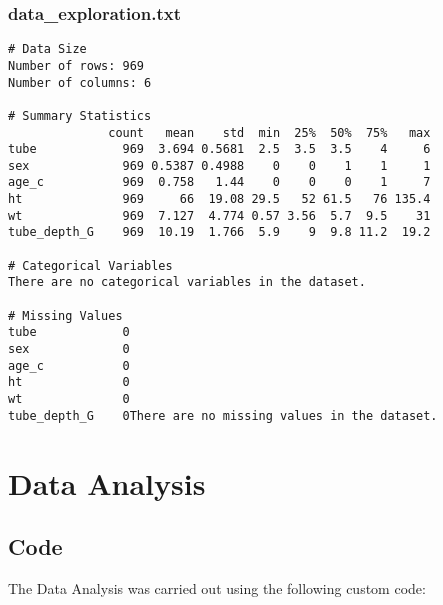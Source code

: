 \documentclass[11pt]{article}
\begin{document}
\subsubsection*{data\_exploration.txt}

\begin{Verbatim}[tabsize=4]
# Data Size
Number of rows: 969
Number of columns: 6

# Summary Statistics
              count   mean    std  min  25%  50%  75%   max
tube            969  3.694 0.5681  2.5  3.5  3.5    4     6
sex             969 0.5387 0.4988    0    0    1    1     1
age_c           969  0.758   1.44    0    0    0    1     7
ht              969     66  19.08 29.5   52 61.5   76 135.4
wt              969  7.127  4.774 0.57 3.56  5.7  9.5    31
tube_depth_G    969  10.19  1.766  5.9    9  9.8 11.2  19.2

# Categorical Variables
There are no categorical variables in the dataset.

# Missing Values
tube            0
sex             0
age_c           0
ht              0
wt              0
tube_depth_G    0There are no missing values in the dataset.

\end{Verbatim}

\section{Data Analysis}
\subsection{{Code}}
The Data Analysis was carried out using the following custom code:
\end{document}
